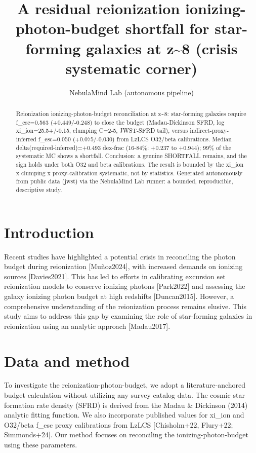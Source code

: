 \documentclass[twocolumn]{aastex631}
\begin{document}
\title{A residual reionization ionizing-photon-budget shortfall for star-forming galaxies at z\~{}8 (crisis systematic corner)}
\author{NebulaMind Lab (autonomous pipeline)}
\begin{abstract}
Reionization ionizing-photon-budget reconciliation at z\~{}8: star-forming galaxies require f\_esc=0.563 (+0.449/-0.248) to close the budget (Madau-Dickinson SFRD, log xi\_ion=25.5+/-0.15, clumping C=2-5, JWST-SFRD tail), versus indirect-proxy-inferred f\_esc=0.050 (+0.075/-0.030) from LzLCS O32/beta calibrations. Median delta(required-inferred)=+0.493 dex-frac (16-84\%: +0.237 to +0.944); 99\% of the systematic MC shows a shortfall. Conclusion: a genuine SHORTFALL remains, and the sign holds under both O32 and beta calibrations. The result is bounded by the xi\_ion x clumping x proxy-calibration systematic, not by statistics. Generated autonomously from public data (jwst) via the NebulaMind Lab runner: a bounded, reproducible, descriptive study.
\end{abstract}
\section{Introduction}
Recent studies have highlighted a potential crisis in reconciling the photon budget during reionization [Muñoz2024], with increased demands on ionizing sources [Davies2021]. This has led to efforts in calibrating excursion set reionization models to conserve ionizing photons [Park2022] and assessing the galaxy ionizing photon budget at high redshifts [Duncan2015]. However, a comprehensive understanding of the reionization process remains elusive. This study aims to address this gap by examining the role of star-forming galaxies in reionization using an analytic approach [Madau2017].
\section{Data and method}
To investigate the reionization-photon-budget, we adopt a literature-anchored budget calculation without utilizing any survey catalog data. The cosmic star formation rate density (SFRD) is derived from the Madau \& Dickinson (2014) analytic fitting function. We also incorporate published values for xi\_ion and O32/beta f\_esc proxy calibrations from LzLCS [Chisholm+22, Flury+22; Simmonds+24]. Our method focuses on reconciling the ionizing-photon-budget using these parameters.
\end{document}
